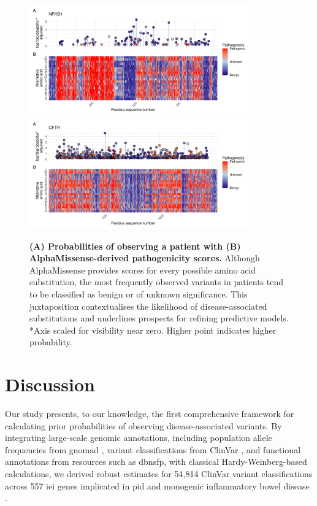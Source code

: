 \begin{figure}[ht]
\begin{center}
    \includegraphics[width=0.85\textwidth]{../images/p_alphamissense_NFKB1.pdf}
    \includegraphics[width=0.85\textwidth]{../images/p_alphamissense_CFTR.pdf}
\end{center}
\caption{\textbf{(A) Probabilities of observing a patient with (B) AlphaMissense-derived pathogenicity scores.} Although AlphaMissense provides scores for every possible amino acid substitution, the most frequently observed variants in patients tend to be classified as benign or of unknown significance. This juxtaposition contextualises the likelihood of disease-associated substitutions and underlines prospects for refining predictive models. *Axis scaled for visibility near zero. Higher point indicates higher probability.}
 \label{fig:alphamissense}
\end{figure}

\FloatBarrier
\section{Discussion}

Our study presents, to our knowledge, the first comprehensive framework for calculating prior probabilities of observing disease-associated variants. By integrating large-scale genomic annotations, including population allele frequencies from \ac{gnomad} \cite{karczewski2020mutational}, variant classifications from ClinVar \cite{landrum_clinvar_2018}, and functional annotations from resources such as \ac{dbnsfp}, with classical Hardy-Weinberg-based calculations, we derived robust estimates for 54,814 ClinVar variant classifications across 557 \ac{iei} genes implicated in \ac{pid} and monogenic inflammatory bowel disease \cite{lawless_panelapprex_2025, tangye_human_2022}.

